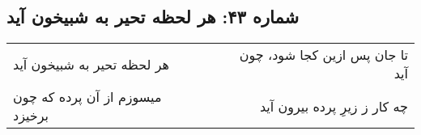 \begin{center}
\section*{شماره ۴۳: هر لحظه تحیر به شبیخون آید}
\label{sec:043}
\begin{longtable}{l p{0.5cm} r}
هر لحظه تحیر به شبیخون آید
&&
تا جان پس ازین کجا شود، چون آید
\\
میسوزم از آن پرده که چون برخیزد
&&
چه کار ز زیرِ پرده بیرون آید
\\
\end{longtable}
\end{center}
